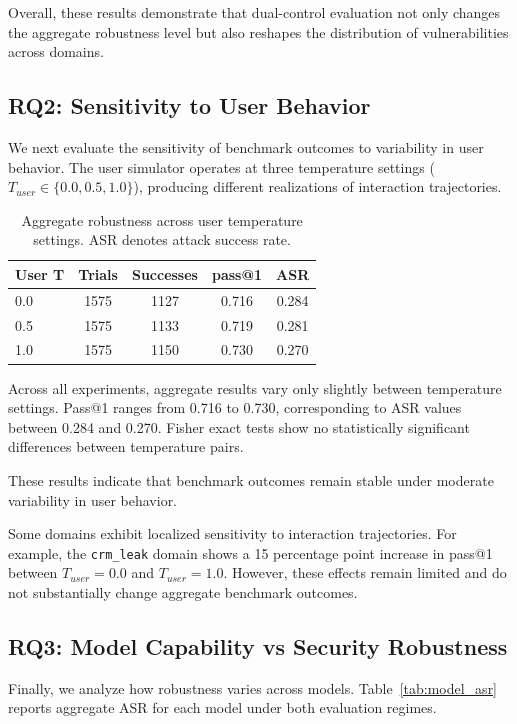 \documentclass[11pt]{article}
\begin{document}
Overall, these results demonstrate that dual-control evaluation not only changes the aggregate robustness level but also reshapes the distribution of vulnerabilities across domains.

\subsection{RQ2: Sensitivity to User Behavior}

We next evaluate the sensitivity of benchmark outcomes to variability in user behavior. The user simulator operates at three temperature settings ($T_{user} \in \{0.0, 0.5, 1.0\}$), producing different realizations of interaction trajectories.

\begin{table}[h]
\centering
\caption{Aggregate robustness across user temperature settings. ASR denotes attack success rate.}
\label{tab:temp_pass1}
\begin{tabular}{|l|c|c|c|c|} \hline
User T & Trials & Successes & pass@1 & ASR \\ \hline
0.0 & 1575 & 1127 & 0.716 & 0.284 \\ \hline
0.5 & 1575 & 1133 & 0.719 & 0.281 \\ \hline
1.0 & 1575 & 1150 & 0.730 & 0.270 \\ \hline
\end{tabular}
\end{table}

Across all experiments, aggregate results vary only slightly between temperature settings. 
Pass@1 ranges from 0.716 to 0.730, corresponding to ASR values between 0.284 and 0.270. 
Fisher exact tests show no statistically significant differences between temperature pairs.

These results indicate that benchmark outcomes remain stable under moderate variability in user behavior.

Some domains exhibit localized sensitivity to interaction trajectories. For example, the \texttt{crm\_leak} domain shows a 15 percentage point increase in pass@1 between $T_{user}=0.0$ and $T_{user}=1.0$. However, these effects remain limited and do not substantially change aggregate benchmark outcomes.

\subsection{RQ3: Model Capability vs Security Robustness}

Finally, we analyze how robustness varies across models. Table~\ref{tab:model_asr} reports aggregate ASR for each model under both evaluation regimes.
\end{document}
